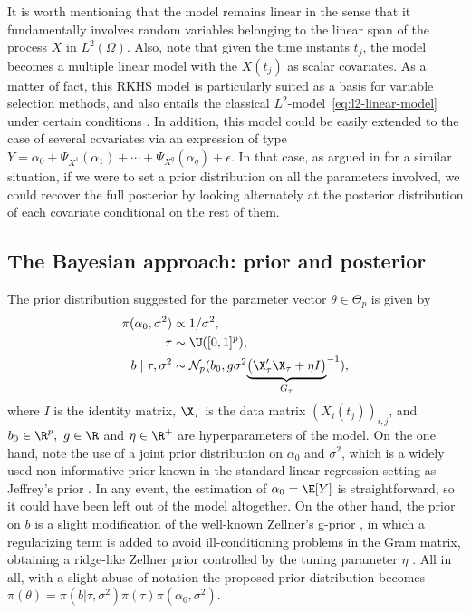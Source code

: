It is worth mentioning that the model remains linear in the sense that it fundamentally involves random variables belonging to the linear span of the process \(X\) in \(L^2(\Omega)\). Also, note that given the time instants \(t_j\), the model becomes a multiple linear model with the \(X(t_j)\) as scalar covariates. As a matter of fact, this RKHS model is particularly suited as a basis for variable selection methods, and also entails the classical \(L^2\)-model~\eqref{eq:l2-linear-model} under certain conditions \citep[see][Sec.~3]{berrendero2020general}. In addition, this model could be easily extended to the case of several covariates via an expression of type \(Y=\alpha_0 + \Psi_{X^{1}}(\alpha_1) + \cdots + \Psi_{X^{q}}(\alpha_q) + \epsilon\). In that case, as argued in \citet{grollemund2019bayesian} for a similar situation, if we were to set a prior distribution on all the parameters involved, we could recover the full posterior by looking alternately at the posterior distribution of each covariate conditional on the rest of them.

\subsection*{The Bayesian approach: prior and posterior}

The prior distribution suggested for the parameter vector \(\theta \in \Theta_p\) is given by
\begin{align}\label{eq:prior-linear}
  \begin{split}
  \pi(\alpha_0, \sigma^2)              & \propto 1/\sigma^2,                                                     \\
  \tau                     & \sim \U([0, 1]^p),                                              \\
  b\mid \tau, \sigma^2 & \sim \mathcal N_p(b_0, g\sigma^2{\underbrace{\left(\X_\tau' \X_\tau + \eta I\right)}_{G_\tau}}^{-1}),
\end{split}
\end{align}
where \(I\) is the identity matrix, \(\X_\tau\) is the data matrix \((X_i(t_j))_{i,j}\), and \(b_0\in \R^p, \ g \in \R\) and \(\eta \in \R^+\) are hyperparameters of the model. On the one hand, note the use of a joint prior distribution on \(\alpha_0\) and \(\sigma^2\), which is a widely used non-informative prior known in the standard linear regression setting as Jeffrey's prior \citep{jeffreys1946invariant}. In any event, the estimation of \(\alpha_0=\E[Y]\) is straightforward, so it could have been left out of the model altogether. On the other hand, the prior on \(b\) is a slight modification of the well-known Zellner's g-prior \citep{zellner1986assessing}, in which a regularizing term is added to avoid ill-conditioning problems in the Gram matrix, obtaining a ridge-like Zellner prior controlled by the tuning parameter \(\eta\) \citep{baragatti2012study}. All in all, with a slight abuse of notation the proposed prior distribution becomes \(\pi(\theta) = \pi(b| \tau, \sigma^2)\pi(\tau)\pi(\alpha_0, \sigma^2)\).

